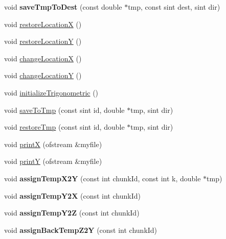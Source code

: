 \begin{DoxyCompactItemize}
void {\bfseries save\+Tmp\+To\+Dest} (const double $\ast$tmp, const sint dest, sint dir)
\item 
void \mbox{\hyperlink{classPencilDcmp_a559e7d0018fe962d6a73e2f70f831de0}{restore\+LocationX}} ()
\item 
void \mbox{\hyperlink{classPencilDcmp_a30c55e0b0ae5ecbe1eeb005190c89e21}{restore\+LocationY}} ()
\item 
void \mbox{\hyperlink{classPencilDcmp_a09f2e5cdf07d70efde9d42c455b61295}{change\+LocationX}} ()
\item 
void \mbox{\hyperlink{classPencilDcmp_a47f04f2af8e4fbcc7544d04adf7978d5}{change\+LocationY}} ()
\item 
void \mbox{\hyperlink{classPencilDcmp_a58ebcd5b4bf661379cfc89df94f1d1eb}{initialize\+Trigonometric}} ()
\item 
void \mbox{\hyperlink{classPencilDcmp_a59feaa65591c690a68a52fe98ad9da8b}{save\+To\+Tmp}} (const sint id, double $\ast$tmp, sint dir)
\item 
void \mbox{\hyperlink{classPencilDcmp_ae46aa4d19c1c33f1c6ba9f0ae8d53247}{restore\+Tmp}} (const sint id, double $\ast$tmp, sint dir)
\item 
void \mbox{\hyperlink{classPencilDcmp_acf7d6672a7fdc141bfba205b27fb9d84}{printX}} (ofstream \&myfile)
\item 
void \mbox{\hyperlink{classPencilDcmp_af19e8faec61ef717c742af90faa2c40c}{printY}} (ofstream \&myfile)
\item 
\mbox{\label{classPencilDcmp_ada428705a35ecbbb9b86db93f21125fd}} 
void {\bfseries assign\+Temp\+X2Y} (const int chunk\+Id, const int k, double $\ast$tmp)
\item 
\mbox{\label{classPencilDcmp_a82bf7135b75d4a0fe7a7e011af56834c}} 
void {\bfseries assign\+Temp\+Y2X} (const int chunk\+Id)
\item 
\mbox{\label{classPencilDcmp_adad784ec680eea4d05425365fd311d2e}} 
void {\bfseries assign\+Temp\+Y2Z} (const int chunk\+Id)
\item 
\mbox{\label{classPencilDcmp_a05daf8d8db828b6591390c4ac235bd12}} 
void {\bfseries assign\+Back\+Temp\+Z2Y} (const int chunk\+Id)
\item 
\mbox{\label{classPencilDcmp_aae31df14224073d20f48a7cd4259b079}} 

\end{DoxyCompactItemize}

